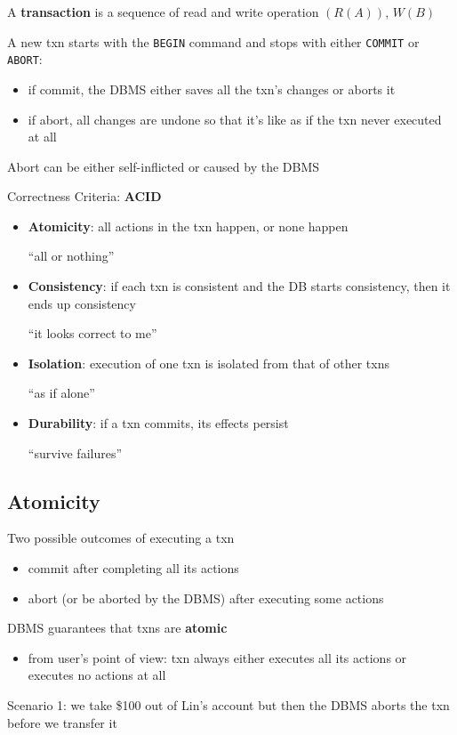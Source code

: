 \documentclass[11pt]{article}
\begin{document}
A \textbf{transaction} is a sequence of read and write operation \((R(A))\), \(W(B)\)

A new txn starts with the \texttt{BEGIN} command and stops with either \texttt{COMMIT} or \texttt{ABORT}:
\begin{itemize}
\item if commit, the DBMS either saves all the txn's changes or aborts it
\item if abort, all changes are undone so that it's like as if the txn never executed at all
\end{itemize}

Abort can be either self-inflicted or caused by the DBMS

Correctness Criteria: \textbf{ACID}
\begin{itemize}
\item \textbf{Atomicity}: all actions in the txn happen, or none happen

``all or nothing''
\item \textbf{Consistency}: if each txn is consistent and the DB starts consistency, then it ends up
consistency

``it looks correct to me''
\item \textbf{Isolation}: execution of one txn is isolated from that of other txns

``as if alone''
\item \textbf{Durability}: if a txn commits, its effects persist

``survive failures''
\end{itemize}
\subsection{Atomicity}
\label{sec:orga2af821}
Two possible outcomes of executing a txn
\begin{itemize}
\item commit after completing all its actions
\item abort (or be aborted by the DBMS) after executing some actions
\end{itemize}

DBMS guarantees that txns are \textbf{atomic}
\begin{itemize}
\item from user's point of view: txn always either executes all its actions or executes no actions
at all
\end{itemize}

Scenario 1: we take \$100 out of Lin's account but then the DBMS aborts the txn before we
transfer it
\end{document}
